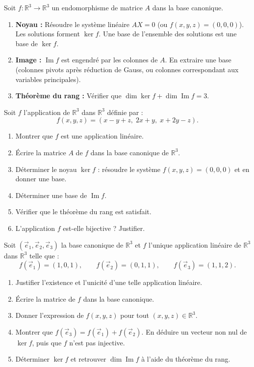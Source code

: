 \documentclass[11pt]{article}
\begin{document}
\begin{methode}
Soit $f : \mathbb{R}^3 \to \mathbb{R}^3$ un endomorphisme de matrice $A$ dans la base canonique.
\begin{enumerate}
\item \textbf{Noyau :} Résoudre le système linéaire $A X = 0$ (ou $f(x,y,z) = (0,0,0)$). Les solutions forment $\ker f$. Une base de l'ensemble des solutions est une base de $\ker f$.
\item \textbf{Image :} $\operatorname{Im} f$ est engendré par les colonnes de $A$. En extraire une base (colonnes pivots après réduction de Gauss, ou colonnes correspondant aux variables principales).
\item \textbf{Théorème du rang :} Vérifier que $\dim \ker f + \dim \operatorname{Im} f = 3$.
\end{enumerate}
\end{methode}

\begin{exercice}
Soit $f$ l'application de $\mathbb{R}^3$ dans $\mathbb{R}^3$ définie par :
\[ f(x, y, z) = (x - y + z, \; 2x + y, \; x + 2y - z). \]
\begin{enumerate}
\item Montrer que $f$ est une application linéaire.
\item Écrire la matrice $A$ de $f$ dans la base canonique de $\mathbb{R}^3$.
\item Déterminer le noyau $\ker f$ : résoudre le système $f(x, y, z) = (0, 0, 0)$ et en donner une base.
\item Déterminer une base de $\operatorname{Im} f$.
\item Vérifier que le théorème du rang est satisfait.
\item L'application $f$ est-elle bijective ? Justifier.
\end{enumerate}
\end{exercice}

\begin{exercice}
Soit $(\vec{e}_1, \vec{e}_2, \vec{e}_3)$ la base canonique de $\mathbb{R}^3$ et $f$ l'unique application linéaire de $\mathbb{R}^3$ dans $\mathbb{R}^3$ telle que :
\[ f(\vec{e}_1) = (1, 0, 1), \qquad f(\vec{e}_2) = (0, 1, 1), \qquad f(\vec{e}_3) = (1, 1, 2). \]
\begin{enumerate}
\item Justifier l'existence et l'unicité d'une telle application linéaire.
\item Écrire la matrice de $f$ dans la base canonique.
\item Donner l'expression de $f(x, y, z)$ pour tout $(x, y, z) \in \mathbb{R}^3$.
\item Montrer que $f(\vec{e}_3) = f(\vec{e}_1) + f(\vec{e}_2)$. En déduire un vecteur non nul de $\ker f$, puis que $f$ n'est pas injective.
\item Déterminer $\ker f$ et retrouver $\dim \operatorname{Im} f$ à l'aide du théorème du rang.
\end{enumerate}
\end{exercice}
\end{document}

